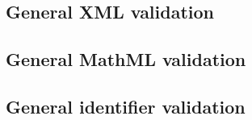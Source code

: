 \subsection*{General XML validation} \begin{sbmlenum}


\begin{blockChanged}


\end{blockChanged}

\end{sbmlenum} \subsection*{General MathML validation} \begin{sbmlenum}


\begin{blockChanged}


\end{blockChanged}


\end{sbmlenum} \subsection*{General identifier validation}  \begin{sbmlenum}


\begin{blockChanged}


\end{blockChanged}



\end{sbmlenum}
